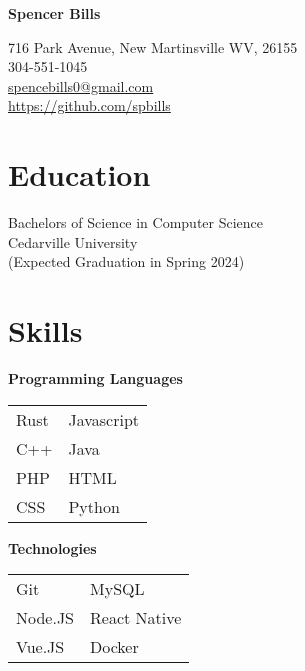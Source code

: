 \documentclass[10pt]{article}
\begin{document}
    \begin{paracol}{2}
        \parbox[top][0.08\textheight][c]{\linewidth}{
            \textbf{\Huge{Spencer Bills}}
        }
        
        \switchcolumn
        
        \parbox[top][0.08\textheight][c]{\linewidth}{
                    716 Park Avenue, New Martinsville WV, 26155 \\
                    304-551-1045 \\
                    \href{mailto://spencebills0@gmail.com}{spencebills0@gmail.com} \\
                    \url{https://github.com/spbills}
        }
        
        \switchcolumn

        \section*{Education}
        \parbox[top][][c]{\linewidth}{
            Bachelors of Science in Computer Science \\
            Cedarville University \\  
            (Expected Graduation in Spring 2024)
        }
        
        \vspace{0.25in}
        
        \section*{Skills}

        \parbox[top][][c]{\linewidth}{
            \begin{center}
                \textbf{Programming Languages}
            \end{center}
            \begin{tabularx}{\linewidth}{YY}

                Rust & Javascript \\
                C++ & Java \\
                PHP & HTML \\
                CSS & Python \\
            \end{tabularx}
            
            \begin{center}
                \textbf{Technologies}
            \end{center}
            \begin{tabularx}{\linewidth}{YY}
                Git & MySQL \\
                Node.JS & React Native  \\
                Vue.JS & Docker \\
            \end{tabularx}
        }


\end{paracol}
\end{document}

